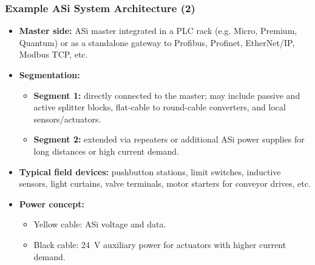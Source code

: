 \begin{frame}
	\frametitle{Example ASi System Architecture (2)}
	\begin{itemize}
		\item \textbf{Master side:}
			ASi master integrated in a PLC rack (e.g. Micro, Premium, Quantum) or as a standalone gateway to
			Profibus, Profinet, EtherNet/IP, Modbus TCP, etc.
		\item \textbf{Segmentation:}
		\begin{itemize}
			\item \textbf{Segment 1:} directly connected to the master; may include passive and active splitter blocks,
				flat-cable to round-cable converters, and local sensors/actuators.
			\item \textbf{Segment 2:} extended via repeaters or additional ASi power supplies for long distances
				or high current demand.
		\end{itemize}
		\item \textbf{Typical field devices:}
			pushbutton stations, limit switches, inductive sensors, light curtains, valve terminals,
			motor starters for conveyor drives, etc.
		\item \textbf{Power concept:}
		\begin{itemize}
			\item Yellow cable: ASi voltage and data.
			\item Black cable: 24~V auxiliary power for actuators with higher current demand.
		\end{itemize}
	\end{itemize}
\end{frame}

